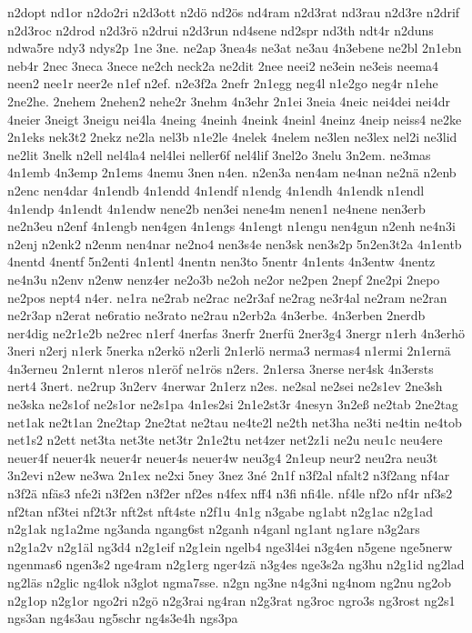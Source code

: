 {n2dopt
nd1or
n2do2ri
n2d3ott
n2dö
nd2ös
nd4ram
n2d3rat
nd3rau
n2d3re
n2drif
n2d3roc
n2drod
n2d3rö
n2drui
n2d3run
nd4sene
nd2spr
nd3th
ndt4r
n2duns
ndwa5re
ndy3
ndys2p
1ne
3ne.
ne2ap
3nea4s
ne3at
ne3au
4n3ebene
ne2bl
2n1ebn
neb4r
2nec
3neca
3nece
ne2ch
neck2a
ne2dit
2nee
neei2
ne3ein
ne3eis
neema4
neen2
nee1r
neer2e
n1ef
n2ef.
n2e3f2a
2nefr
2n1egg
neg4l
n1e2go
neg4r
n1ehe
2ne2he.
2nehem
2nehen2
nehe2r
3nehm
4n3ehr
2n1ei
3neia
4neic
nei4dei
nei4dr
4neier
3neigt
3neigu
nei4la
4neing
4neinh
4neink
4neinl
4neinz
4neip
neiss4
ne2ke
2n1eks
nek3t2
2nekz
ne2la
nel3b
n1e2le
4nelek
4nelem
ne3len
ne3lex
nel2i
ne3lid
ne2lit
3nelk
n2ell
nel4la4
nel4lei
neller6f
nel4lif
3nel2o
3nelu
3n2em.
ne3mas
4n1emb
4n3emp
2n1ems
4nemu
3nen
n4en.
n2en3a
nen4am
ne4nan
ne2nä
n2enb
n2enc
nen4dar
4n1endb
4n1endd
4n1endf
n1endg
4n1endh
4n1endk
n1endl
4n1endp
4n1endt
4n1endw
nene2b
nen3ei
nene4m
nenen1
ne4nene
nen3erb
ne2n3eu
n2enf
4n1engb
nen4gen
4n1engs
4n1engt
n1engu
nen4gun
n2enh
ne4n3i
n2enj
n2enk2
n2enm
nen4nar
ne2no4
nen3s4e
nen3sk
nen3s2p
5n2en3t2a
4n1entb
4nentd
4nentf
5n2enti
4n1entl
4nentn
nen3to
5nentr
4n1ents
4n3entw
4nentz
ne4n3u
n2env
n2enw
nenz4er
ne2o3b
ne2oh
ne2or
ne2pen
2nepf
2ne2pi
2nepo
ne2pos
nept4
n4er.
ne1ra
ne2rab
ne2rac
ne2r3af
ne2rag
ne3r4al
ne2ram
ne2ran
ne2r3ap
n2erat
ne6ratio
ne3rato
ne2rau
n2erb2a
4n3erbe.
4n3erben
2nerdb
ner4dig
ne2r1e2b
ne2rec
n1erf
4nerfas
3nerfr
2nerfü
2ner3g4
3nergr
n1erh
4n3erhö
3neri
n2erj
n1erk
5nerka
n2erkö
n2erli
2n1erlö
nerma3
nermas4
n1ermi
2n1ernä
4n3erneu
2n1ernt
n1eros
n1eröf
ne1rös
n2ers.
2n1ersa
3nerse
ner4sk
4n3ersts
nert4
3nert.
ne2rup
3n2erv
4nerwar
2n1erz
n2es.
ne2sal
ne2sei
ne2s1ev
2ne3sh
ne3ska
ne2s1of
ne2s1or
ne2s1pa
4n1es2si
2n1e2st3r
4nesyn
3n2eß
ne2tab
2ne2tag
net1ak
ne2t1an
2ne2tap
2ne2tat
ne2tau
ne4te2l
ne2th
net3ha
ne3ti
ne4tin
ne4tob
net1s2
n2ett
net3ta
net3te
net3tr
2n1e2tu
net4zer
net2z1i
ne2u
neu1c
neu4ere
neuer4f
neuer4k
neuer4r
neuer4s
neuer4w
neu3g4
2n1eup
neur2
neu2ra
neu3t
3n2evi
n2ew
ne3wa
2n1ex
ne2xi
5ney
3nez
3né
2n1f
n3f2al
nfalt2
n3f2ang
nf4ar
n3f2ä
nfäs3
nfe2i
n3f2en
n3f2er
nf2es
n4fex
nff4
n3fi
nfi4le.
nf4le
nf2o
nf4r
nf3s2
nf2tan
nf3tei
nf2t3r
nft2st
nft4ste
n2f1u
4n1g
n3gabe
ng1abt
n2g1ac
n2g1ad
n2g1ak
ng1a2me
ng3anda
ngang6st
n2ganh
n4ganl
ng1ant
ng1are
n3g2ars
n2g1a2v
n2g1äl
ng3d4
n2g1eif
n2g1ein
ngelb4
nge3l4ei
n3g4en
n5gene
nge5nerw
ngenmas6
ngen3s2
nge4ram
n2g1erg
nger4zä
n3g4es
nge3s2a
ng3hu
n2g1id
ng2lad
ng2läs
n2glic
ng4lok
n3glot
ngma7sse.
n2gn
ng3ne
n4g3ni
ng4nom
ng2nu
ng2ob
n2g1op
n2g1or
ngo2ri
n2gö
n2g3rai
ng4ran
n2g3rat
ng3roc
ngro3s
ng3rost
ng2s1
ngs3an
ng4s3au
ng5schr
ng4s3e4h
ngs3pa
}
